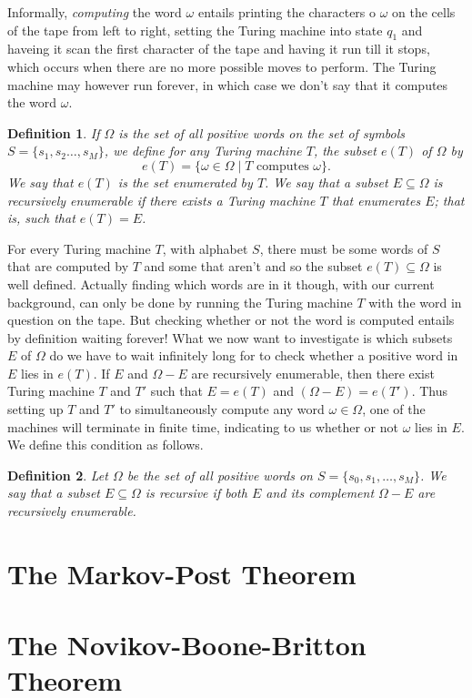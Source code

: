 \documentclass[12pt]{article}
\newtheorem{definition}{Definition}
\theoremstyle{definition}
\numberwithin{equation}{theorem}
\begin{document}
Informally, \emph{computing} the word $\omega$ entails printing the characters o $\omega$ on the cells of the tape from left to right, setting the Turing machine into state $q_1$ and haveing it scan the first character of the tape and having it run till it stops, which occurs when there are no more possible moves to perform. The Turing machine may however run forever, in which case we don't say that it computes the word $\omega$.

\begin{definition}
  If $\Omega$ is the set of all positive words on the set of symbols $S = \{s_1, s_2 \dots, s_M\}$, we define for any Turing machine $T$, the subset $e(T)$ of $\Omega$ by
  \begin{equation*}
    e(T) = \{\omega \in \Omega \mid T \text{ computes } \omega\}.
  \end{equation*}
  We say that $e(T)$ is the set \emph{enumerated by $T$}. We say that a subset $E \subseteq \Omega$ is \emph{recursively enumerable} if there exists a Turing machine $T$ that enumerates $E$; that is, such that  $e(T) = E$.
\end{definition}

For every Turing machine $T$, with alphabet $S$, there must be some words of $S$ that are computed by $T$ and some that aren't and so the subset $e(T) \subseteq \Omega$ is well defined. Actually finding which words are in it though, with our current background, can only be done by running the Turing machine $T$ with the word in question on the tape. But checking whether or not the word is computed entails by definition waiting forever! What we now want to investigate is which subsets $E$ of $\Omega$ do we have to wait infinitely long for to check whether a positive word in $E$ lies in $e(T)$. If $E$ and $\Omega - E$ are recursively enumerable, then there exist Turing machine $T$ and $T'$ such that $E = e(T)$ and $(\Omega - E) = e(T')$. Thus setting up $T$ and $T'$ to simultaneously compute any word $\omega \in \Omega$, one of the machines will terminate in finite time, indicating to us whether or not $\omega$ lies in $E$. We define this condition as follows.

\begin{definition}
  Let $\Omega$ be the set of all positive words on $S = \{s_0,s_1, \dots, s_M \}$. We say that a subset $E \subseteq \Omega$ is \emph{recursive} if both $E$ and its complement $\Omega - E$ are recursively enumerable.
\end{definition}
\section{The Markov-Post Theorem}
\section{The Novikov-Boone-Britton Theorem}
\nocite{rotman1999introduction}



\end{document}
